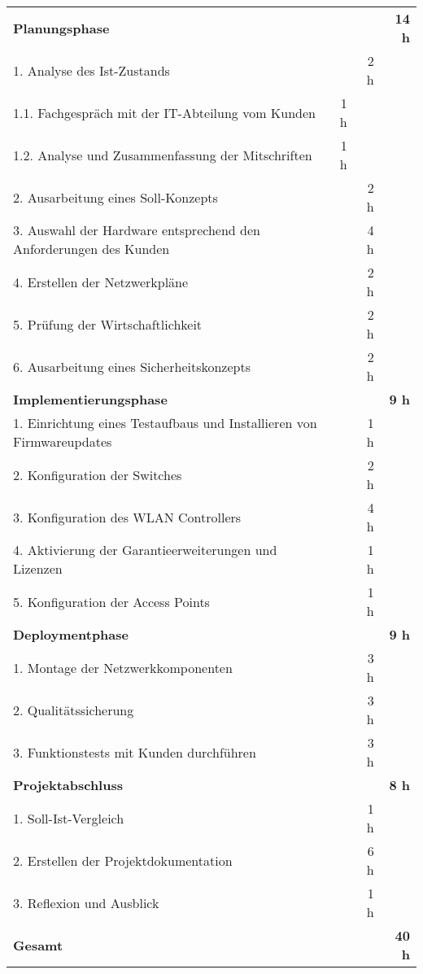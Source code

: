 \begin{tabularx}{\textwidth}{Xrrr}
\rowcolor{heading}\textbf{Planungsphase} & \textbf{} & \textbf{} & \textbf{14 h} \\
1. Analyse des Ist-Zustands &       & 2 h   &  \\
\rowcolor{odd}1.1. Fachgespräch mit der IT-Abteilung vom Kunden & 1 h   &       &  \\
1.2. Analyse und Zusammenfassung der Mitschriften & 1 h   &       &  \\
\rowcolor{odd}2. Ausarbeitung eines Soll-Konzepts &       & 2 h   &  \\
3. Auswahl der Hardware entsprechend den Anforderungen des Kunden &       & 4 h   &  \\
\rowcolor{odd}4. Erstellen der Netzwerkpläne  &       & 2 h   &  \\
5. Prüfung der Wirtschaftlichkeit &       & 2 h   &  \\
\rowcolor{odd}6. Ausarbeitung eines Sicherheitskonzepts &       & 2 h   &  \\
\rowcolor{heading}\textbf{Implementierungsphase} & \textbf{} & \textbf{} & \textbf{9 h} \\
1. Einrichtung eines Testaufbaus und Installieren von Firmwareupdates &       & 1 h   &  \\
\rowcolor{odd}2. Konfiguration der Switches &       & 2 h   &  \\
3. Konfiguration des WLAN Controllers &       & 4 h   &  \\
\rowcolor{odd}4. Aktivierung der Garantieerweiterungen und Lizenzen &       & 1 h   &  \\
5. Konfiguration der Access Points &       & 1 h   &  \\
\rowcolor{heading}\textbf{Deploymentphase} & \textbf{} & \textbf{} & \textbf{9 h} \\
1. Montage der Netzwerkkomponenten &       & 3 h   &  \\
\rowcolor{odd}2. Qualitätssicherung &       & 3 h   &  \\
3. Funktionstests mit Kunden durchführen &       & 3 h  &  \\
\rowcolor{heading}\textbf{Projektabschluss} & \textbf{} & \textbf{} & \textbf{8 h} \\
1. Soll-Ist-Vergleich &       & 1 h   &  \\
\rowcolor{odd}2. Erstellen der Projektdokumentation &       & 6 h   &  \\
3. Reflexion und Ausblick &       & 1 h   &  \\
\hline
\hline
\rowcolor{heading}\textbf{Gesamt} & \textbf{} & \textbf{} & \textbf{40 h} \\
\end{tabularx}


